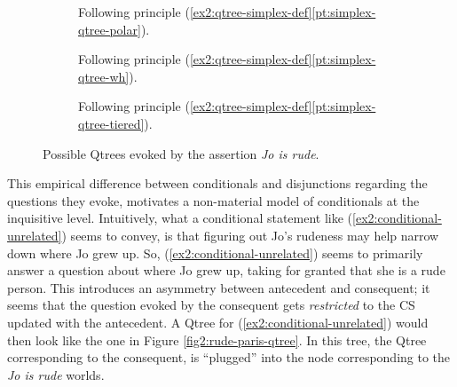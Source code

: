 \begin{exe}
	\ex
	\begin{xlist}
		\label{ex2:conditional-unrelated}
		\label{ex2:material-conditional-underlated}
	\end{xlist}
\end{exe}

\begin{figure}[H]
	\centering
	\begin{subfigure}[t]{.2\linewidth}
		\centering\scalebox{.85}{
		\begin{forest}
			[CS[Rude][$\neg$Rude]]
		\end{forest}}
		\caption{Following principle (\ref{ex2:qtree-simplex-def}\ref{pt:simplex-qtree-polar}).}\label{fig2:rude-qtree-polar}
	\end{subfigure}
	\hfill
	\begin{subfigure}[t]{.75\linewidth}
		\centering\scalebox{.85}{
		\begin{forest}
			[CS[Rude$\wedge$Smart][$\neg$Rude$\wedge$Smart][Rude$\wedge$$\neg$Smart][$\neg$Rude$\wedge$$\neg$Smart]]
		\end{forest}}
		\caption{Following principle (\ref{ex2:qtree-simplex-def}\ref{pt:simplex-qtree-wh}).}\label{fig2:rude-qtree-wh}
	\end{subfigure}
	
	\begin{subfigure}[t]{\linewidth}
		\centering\scalebox{.85}{
		\begin{forest}
			[CS[Good traits [$\neg$Rude$\wedge$Smart]][Bad traits [Rude$\wedge$$\neg$Smart]][Mixed traits [Rude$\wedge$Smart][$\neg$Rude$\wedge$$\neg$Smart]]]
		\end{forest}}
		\caption{Following principle (\ref{ex2:qtree-simplex-def}\ref{pt:simplex-qtree-tiered}).}
	\end{subfigure}
	\caption{Possible Qtrees evoked by the assertion \textit{Jo is rude}.}\label{fig2:rude-qtrees}
\end{figure}


This empirical difference between conditionals and disjunctions regarding the questions they evoke, motivates a non-material model of conditionals at the inquisitive level. Intuitively, what a conditional statement like (\ref{ex2:conditional-unrelated}) seems to convey, is that figuring out Jo's rudeness may help narrow down where Jo grew up. So, (\ref{ex2:conditional-unrelated}) seems to primarily answer a question about where Jo grew up, taking for granted that she is a rude person. This introduces an asymmetry between antecedent and consequent; it seems that the question evoked by the consequent gets \textit{restricted} to the CS updated with the antecedent. A Qtree for (\ref{ex2:conditional-unrelated}) would then look like the one in Figure \ref{fig2:rude-paris-qtree}. In this tree, the Qtree corresponding to the consequent, is ``plugged'' into the node corresponding to the \textit{Jo is rude} worlds.


